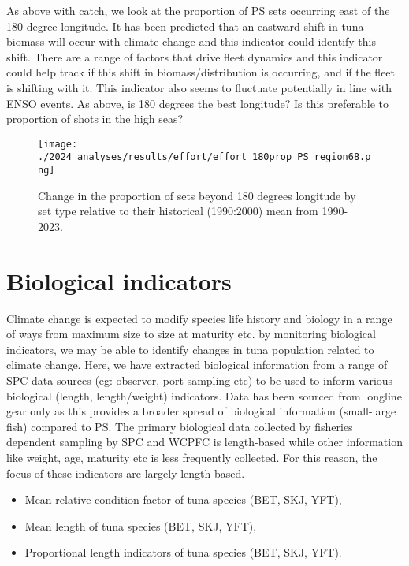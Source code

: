 \documentclass[
]{article}
\begin{document}
As above with catch, we look at the proportion of PS sets occurring east
of the 180 degree longitude. It has been predicted that an eastward
shift in tuna biomass will occur with climate change and this indicator
could identify this shift. There are a range of factors that drive fleet
dynamics and this indicator could help track if this shift in
biomass/distribution is occurring, and if the fleet is shifting with it.
This indicator also seems to fluctuate potentially in line with ENSO
events. As above, is 180 degrees the best longitude? Is this preferable
to proportion of shots in the high seas?

\begin{figure}
\centering
\texttt{[image: ./2024\_analyses/results/effort/effort\_180prop\_PS\_region68.png]}
\caption{Change in the proportion of sets beyond 180 degrees longitude
by set type relative to their historical (1990:2000) mean from
1990-2023.}
\end{figure}

\clearpage

\hypertarget{biological-indicators}{%
\section{Biological indicators}\label{biological-indicators}}

Climate change is expected to modify species life history and biology in
a range of ways from maximum size to size at maturity etc. by monitoring
biological indicators, we may be able to identify changes in tuna
population related to climate change. Here, we have extracted biological
information from a range of SPC data sources (eg: observer, port
sampling etc) to be used to inform various biological (length,
length/weight) indicators. Data has been sourced from longline gear only
as this provides a broader spread of biological information (small-large
fish) compared to PS. The primary biological data collected by fisheries
dependent sampling by SPC and WCPFC is length-based while other
information like weight, age, maturity etc is less frequently collected.
For this reason, the focus of these indicators are largely length-based.

\begin{itemize}
\item
  Mean relative condition factor of tuna species (BET, SKJ, YFT),
\item
  Mean length of tuna species (BET, SKJ, YFT),
\item
  Proportional length indicators of tuna species (BET, SKJ, YFT).
\end{itemize}
\end{document}
